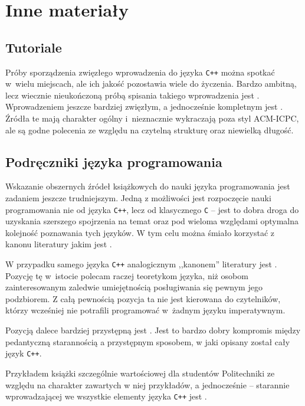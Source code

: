 \section{Inne materiały}\label{sec:othersources}

\subsection{Tutoriale}

Próby sporządzenia zwięzłego wprowadzenia do języka \texttt{C++} można spotkać
w~wielu miejscach, ale ich jakość pozostawia wiele do życzenia. Bardzo ambitną,
lecz wiecznie nieukończoną próbą spisania takiego wprowadzenia jest
. Wprowadzeniem jeszcze bardziej zwięzłym,
a jednocześnie kompletnym jest . Źródła te mają
charakter ogólny i~nieznacznie wykraczają poza styl ACM-ICPC, ale są godne
polecenia ze względu na czytelną strukturę oraz niewielką długość.

\subsection{Podręczniki języka programowania}

Wskazanie obszernych źródeł książkowych do nauki języka programowania jest
zadaniem jeszcze trudniejszym. Jedną z możliwości jest rozpoczęcie nauki
programowania nie od języka \texttt{C++}, lecz od klasycznego \texttt{C} --
jest to dobra droga do uzyskania szerszego spojrzenia na temat oraz pod wieloma
względami optymalna kolejność poznawania tych języków. W tym celu można
śmiało korzystać z kanonu literatury jakim jest .

W przypadku samego języka \texttt{C++} analogicznym ,,kanonem'' literatury
jest . Pozycję tę w~istocie polecam raczej teoretykom
języka, niż osobom zainteresowanym zaledwie umiejętnością posługiwania się
pewnym jego podzbiorem. Z całą pewnością pozycja ta nie jest kierowana do
czytelników, którzy wcześniej nie potrafili programować w~żadnym języku
imperatywnym.

Pozycją dalece bardziej przystępną jest . Jest to bardzo dobry
kompromis między pedantyczną starannością a przystępnym sposobem, w jaki opisany
został cały język \texttt{C++}.

Przykładem książki szczególnie wartościowej dla studentów Politechniki ze
względu na charakter zawartych w niej przykładów, a jednocześnie -- starannie
wprowadzającej we wszystkie elementy języka \texttt{C++} jest
.

